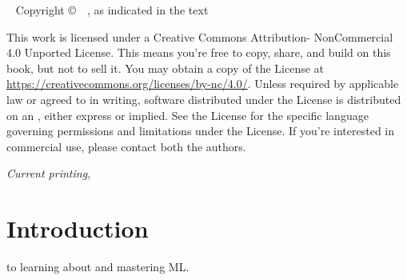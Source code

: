 
\frontmatter

\blankpage


\maketitle


\newpage
\begin{fullwidth}
~\vfill
\thispagestyle{empty}
\setlength{\parindent}{0pt}
\setlength{\parskip}{\baselineskip}
Copyright \copyright\ \the\year\ \thanklessauthor, as indicated in the text


\par{}

\par
This work is licensed under a Creative Commons Attribution-
NonCommercial 4.0 Unported License. This means you're free to
copy, share, and build on this book, but not to sell it. 
You may obtain a copy
of the License at \url{https://creativecommons.org/licenses/by-nc/4.0/}. Unless
required by applicable law or agreed to in writing, software distributed
under the License is distributed on an , either express or implied. See the
License for the specific language governing permissions and limitations
under the License.
If you're interested in commercial use, please contact both the authors.

\par\textit{Current printing, \monthyear}
\end{fullwidth}

\tableofcontents

\listoffigures





\mainmatter

\chapter*{Introduction}


 to learning about and mastering \ac{ML}.  

